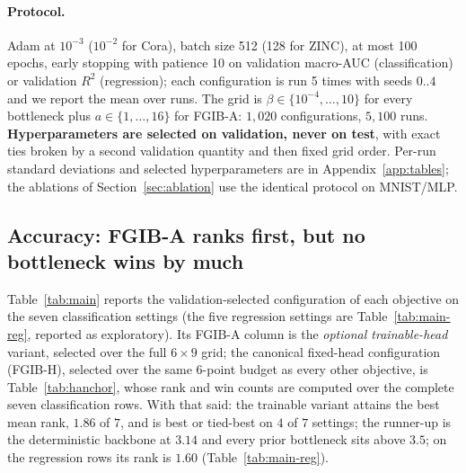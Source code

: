 \documentclass{article} %
\begin{document}
\paragraph{Protocol.}
Adam \citep{kingma2015adam} at $10^{-3}$ ($10^{-2}$ for Cora), batch size 512 (128 for
ZINC), at most 100 epochs, early stopping with patience 10 on validation macro-AUC
(classification) or validation $R^2$ (regression); each configuration is run 5 times
with seeds $0..4$ and we report the mean over runs. The grid is
$\beta \in \{10^{-4},\dots,10\}$ for every bottleneck plus
$a \in \{1,\dots,16\}$ for FGIB-A: $1{,}020$ configurations, $5{,}100$ runs.
\textbf{Hyperparameters are selected on validation, never on test}, with exact ties
broken by a second validation quantity and then fixed grid order. Per-run standard
deviations and selected hyperparameters are in Appendix~\ref{app:tables}; the ablations
of Section~\ref{sec:ablation} use the identical protocol on MNIST/MLP.



\subsection{Accuracy: FGIB-A ranks first, but no bottleneck wins by much}

Table~\ref{tab:main} reports the validation-selected configuration of each objective
on the seven classification settings (the five regression settings are
Table~\ref{tab:main-reg}, reported as exploratory). Its FGIB-A column is the
\emph{optional trainable-head} variant, selected over the full $6\times9$ grid; the
canonical fixed-head configuration (FGIB-H), selected over the same 6-point budget as
every other objective, is Table~\ref{tab:hanchor}, whose rank and win counts are
computed over the complete seven classification rows. With that said: the trainable
variant attains the best mean rank, $1.86$ of $7$, and is best or tied-best on $4$ of
$7$ settings; the runner-up is the deterministic backbone at $3.14$ and every prior
bottleneck sits above $3.5$; on the regression rows its rank is $1.60$
(Table~\ref{tab:main-reg}).
\end{document}
